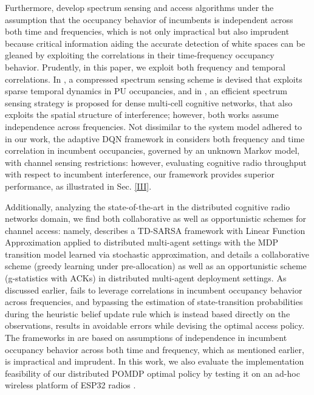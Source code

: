 \documentclass[12pt, draftcls, onecolumn]{IEEEtran}
\begin{document}
Furthermore, \cite{WCL:4, WCL:8, WCL:11} develop spectrum sensing and access algorithms under the assumption that the occupancy behavior of incumbents is independent across both time and frequencies, which is not only impractical but also imprudent because critical information aiding the accurate detection of white spaces can be gleaned by exploiting the correlations in their time-frequency occupancy behavior. Prudently, in this paper, we exploit both frequency and temporal correlations. In \cite{WCL:9}, a compressed spectrum sensing scheme is devised that exploits sparse temporal dynamics in PU occupancies, and in \cite{WCL:10}, an efficient spectrum sensing strategy is proposed for dense multi-cell cognitive networks, that also exploits the spatial structure of interference; however, both works assume independence across frequencies. Not dissimilar to the system model adhered to in our work, the adaptive DQN framework in \cite{WCL:DQN} considers both frequency and time correlation in incumbent occupancies, governed by an unknown Markov model, with channel sensing restrictions: however, evaluating cognitive radio throughput with respect to incumbent interference, our framework provides superior performance, as illustrated in Sec. \ref{III}.

Additionally, analyzing the state-of-the-art in the distributed cognitive radio networks domain, we find both collaborative as well as opportunistic schemes for channel access: namely, \cite{WCL:5} describes a TD-SARSA framework with Linear Function Approximation applied to distributed multi-agent settings with the MDP transition model learned via stochastic approximation, and \cite{WCL:MIT} details a collaborative scheme (greedy learning under pre-allocation) as well as an opportunistic scheme (g-statistics with ACKs) in distributed multi-agent deployment settings. As discussed earlier, \cite{WCL:5} fails to leverage correlations in incumbent occupancy behavior across frequencies, and bypassing the estimation of state-transition probabilities during the heuristic belief update rule which is instead based directly on the observations, results in avoidable errors while devising the optimal access policy. The frameworks in \cite{WCL:MIT} are based on assumptions of independence in incumbent occupancy behavior across both time and frequency, which as mentioned earlier, is impractical and imprudent. In this work, we also evaluate the implementation feasibility of our distributed POMDP optimal policy by testing it on an ad-hoc wireless platform of ESP32 radios \cite{GCTronic:epuck2, Espressif:ESP32}. 
\end{document}
